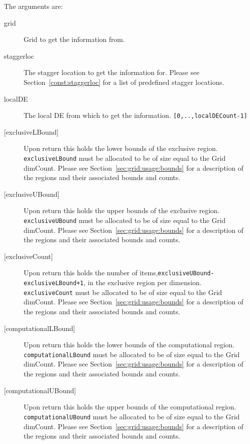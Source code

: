   The arguments are:
  \begin{description}
  \item[grid]
      Grid to get the information from.
  \item[staggerloc]
       The stagger location to get the information for.
       Please see Section~\ref{const:staggerloc} for a list
       of predefined stagger locations.
  \item[localDE]
       The local DE from which to get the information. {\tt [0,..,localDECount-1]}
  \item[{[exclusiveLBound]}]
       Upon return this holds the lower bounds of the exclusive region.
       {\tt exclusiveLBound} must be allocated to be of size equal to the Grid dimCount.
       Please see Section~\ref{sec:grid:usage:bounds} for a description
       of the regions and their associated bounds and counts.
  \item[{[exclusiveUBound]}]
       Upon return this holds the upper bounds of the exclusive region.
       {\tt exclusiveUBound} must be allocated to be of size equal to the Grid dimCount.
       Please see Section~\ref{sec:grid:usage:bounds} for a description
       of the regions and their associated bounds and counts.
  \item[{[exclusiveCount]}]
       Upon return this holds the number of items,{\tt exclusiveUBound-exclusiveLBound+1},
       in the exclusive region per dimension.
       {\tt exclusiveCount} must
       be allocated to be of size equal to the Grid dimCount.
       Please see Section~\ref{sec:grid:usage:bounds} for a description
       of the regions and their associated bounds and counts.
  \item[{[computationalLBound]}]
       \begin{sloppypar}
       Upon return this holds the lower bounds of the computational region.
       {\tt computationalLBound} must be allocated to be of size equal to the Grid dimCount.
       Please see Section~\ref{sec:grid:usage:bounds} for a description
       of the regions and their associated bounds and counts.
       \end{sloppypar}
  \item[{[computationalUBound]}]
       \begin{sloppypar}
       Upon return this holds the upper bounds of the computational region.
       {\tt computationalUBound} must be allocated to be of size equal to the Grid dimCount.
       Please see Section~\ref{sec:grid:usage:bounds} for a description
       of the regions and their associated bounds and counts.

\end{sloppypar}
\end{description}
